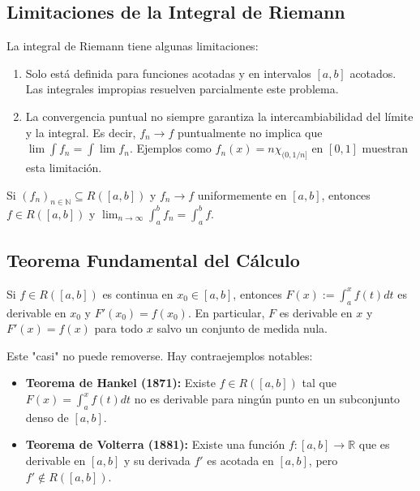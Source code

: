 \documentclass[11pt]{article}
\begin{document}
\subsection{Limitaciones de la Integral de Riemann}
\label{sec:limitations}
La integral de Riemann tiene algunas limitaciones:
\begin{enumerate}
    \item Solo está definida para funciones acotadas y en intervalos $[a,b]$ acotados. Las integrales impropias resuelven parcialmente este problema.
    \item La convergencia puntual no siempre garantiza la intercambiabilidad del límite y la integral. Es decir, $f_n \rightarrow f$ puntualmente no implica que $\lim \int f_n = \int \lim f_n$. Ejemplos como $f_n(x) = n\chi_{(0, 1/n]}$ en $[0,1]$ muestran esta limitación.
\end{enumerate}

\begin{theorem}
Si $(f_n)_{n \in \mathbb{N}} \subseteq R([a,b])$ y $f_n \rightarrow f$ uniformemente en $[a,b]$, entonces $f \in R([a,b])$ y $\lim_{n \rightarrow \infty} \int_{a}^{b} f_n = \int_{a}^{b} f$.
\end{theorem}

\subsection{Teorema Fundamental del Cálculo}
\label{sec:ftc}

\begin{theorem}
Si $f \in R([a,b])$ es continua en $x_0 \in [a,b]$, entonces $F(x) := \int_{a}^{x} f(t)dt$ es derivable en $x_0$ y $F'(x_0) = f(x_0)$. En particular, $F$ es derivable en $x$ y $F'(x) = f(x)$ para todo $x$ salvo un conjunto de medida nula.
\end{theorem}

\begin{note}
Este "casi" no puede removerse. Hay contraejemplos notables:
\begin{itemize}
    \item \textbf{Teorema de Hankel (1871):} Existe $f \in R([a,b])$ tal que $F(x) = \int_{a}^{x} f(t)dt$ no es derivable para ningún punto en un subconjunto denso de $[a,b]$.
    \item \textbf{Teorema de Volterra (1881):} Existe una función $f:[a,b] \rightarrow \mathbb{R}$ que es derivable en $[a,b]$ y su derivada $f'$ es acotada en $[a,b]$, pero $f' \notin R([a,b])$.
\end{itemize}
\end{note}
\end{document}
